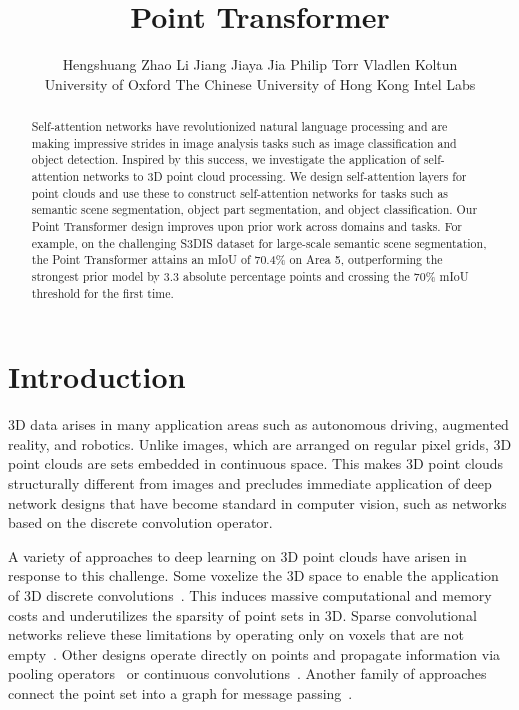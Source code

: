 \documentclass[final]{cvpr}
\begin{document}
\title{Point Transformer}

\author{Hengshuang Zhao \quad Li Jiang \quad Jiaya Jia \quad Philip Torr \quad Vladlen Koltun\\
	University of Oxford \quad
	The Chinese University of Hong Kong \quad
	Intel Labs\\ 
}
\maketitle

\begin{abstract}
Self-attention networks have revolutionized natural language processing and are making impressive strides in image analysis tasks such as image classification and object detection. Inspired by this success, we investigate the application of self-attention networks to 3D point cloud processing. We design self-attention layers for point clouds and use these to construct self-attention networks for tasks such as semantic scene segmentation, object part segmentation, and object classification. Our Point Transformer design improves upon prior work across domains and tasks. For example, on the challenging S3DIS dataset for large-scale semantic scene segmentation, the Point Transformer attains an mIoU of 70.4\% on Area 5, outperforming the strongest prior model by 3.3 absolute percentage points and crossing the 70\% mIoU threshold for the first time.
\end{abstract}

\section{Introduction}
\label{sec:introduction}
3D data arises in many application areas such as autonomous driving, augmented reality, and robotics. Unlike images, which are arranged on regular pixel grids, 3D point clouds are sets embedded in continuous space. This makes 3D point clouds structurally different from images and precludes immediate application of deep network designs that have become standard in computer vision, such as networks based on the discrete convolution operator.

A variety of approaches to deep learning on 3D point clouds have arisen in response to this challenge. Some voxelize the 3D space to enable the application of 3D discrete convolutions~\cite{maturana2015voxnet,song2016ssc}. This induces massive computational and memory costs and underutilizes the sparsity of point sets in 3D. Sparse convolutional networks relieve these limitations by operating only on voxels that are not empty~\cite{graham20183d,choy20194d}.
Other designs operate directly on points and propagate information via pooling operators~\cite{qi2017pointnet,qi2017pointnet2} or continuous convolutions~\cite{wang2018pccn,thomas2019kpconv}. Another family of approaches connect the point set into a graph for message passing~\cite{wang2019dgcnn,li2019deepgcns}.
\end{document}
